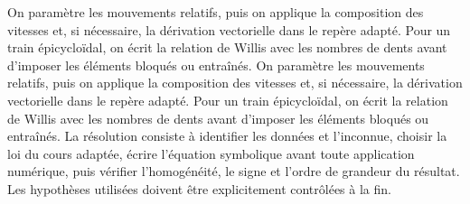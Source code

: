 \begin{corrigebox}[Corrigé]
On paramètre les mouvements relatifs, puis on applique la composition des vitesses et, si nécessaire, la dérivation vectorielle dans le repère adapté. Pour un train épicycloïdal, on écrit la relation de Willis avec les nombres de dents avant d'imposer les éléments bloqués ou entraînés.
On paramètre les mouvements relatifs, puis on applique la composition des vitesses et, si nécessaire, la dérivation vectorielle dans le repère adapté. Pour un train épicycloïdal, on écrit la relation de Willis avec les nombres de dents avant d'imposer les éléments bloqués ou entraînés.
La résolution consiste à identifier les données et l'inconnue, choisir la loi du cours adaptée, écrire l'équation symbolique avant toute application numérique, puis vérifier l'homogénéité, le signe et l'ordre de grandeur du résultat. Les hypothèses utilisées doivent être explicitement contrôlées à la fin.
\end{corrigebox}
